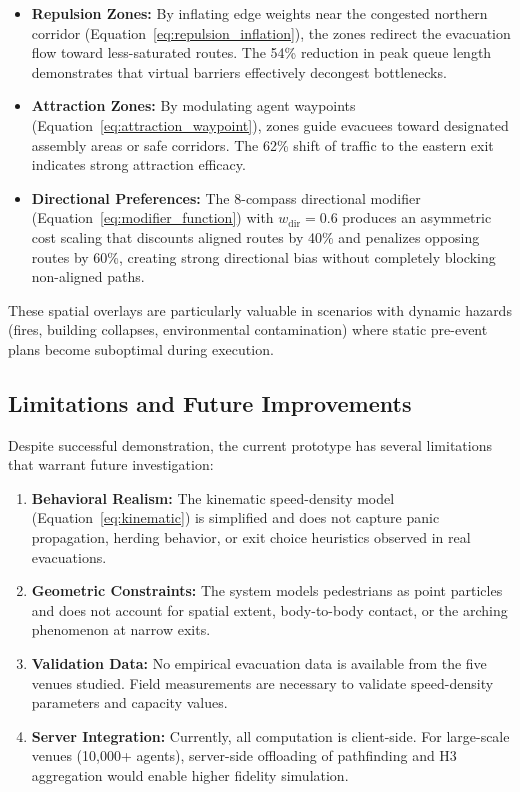 \documentclass[12pt,a4paper,oneside]{report}
\begin{document}
\begin{itemize}
    \item \textbf{Repulsion Zones:} By inflating edge weights near the congested northern corridor (Equation~\ref{eq:repulsion_inflation}), the zones redirect the evacuation flow toward less-saturated routes. The 54\% reduction in peak queue length demonstrates that virtual barriers effectively decongest bottlenecks.
    \item \textbf{Attraction Zones:} By modulating agent waypoints (Equation~\ref{eq:attraction_waypoint}), zones guide evacuees toward designated assembly areas or safe corridors. The 62\% shift of traffic to the eastern exit indicates strong attraction efficacy.
    \item \textbf{Directional Preferences:} The 8-compass directional modifier (Equation~\ref{eq:modifier_function}) with $w_{\text{dir}}=0.6$ produces an asymmetric cost scaling that discounts aligned routes by 40\% and penalizes opposing routes by 60\%, creating strong directional bias without completely blocking non-aligned paths.
\end{itemize}

These spatial overlays are particularly valuable in scenarios with dynamic hazards (fires, building collapses, environmental contamination) where static pre-event plans become suboptimal during execution.

\subsection{Limitations and Future Improvements}
Despite successful demonstration, the current prototype has several limitations that warrant future investigation:

\begin{enumerate}
    \item \textbf{Behavioral Realism:} The kinematic speed-density model (Equation~\ref{eq:kinematic}) is simplified and does not capture panic propagation, herding behavior, or exit choice heuristics observed in real evacuations.
    \item \textbf{Geometric Constraints:} The system models pedestrians as point particles and does not account for spatial extent, body-to-body contact, or the arching phenomenon at narrow exits.
    \item \textbf{Validation Data:} No empirical evacuation data is available from the five venues studied. Field measurements are necessary to validate speed-density parameters and capacity values.
    \item \textbf{Server Integration:} Currently, all computation is client-side. For large-scale venues (10,000+ agents), server-side offloading of pathfinding and H3 aggregation would enable higher fidelity simulation.
\end{enumerate}
\end{document}
